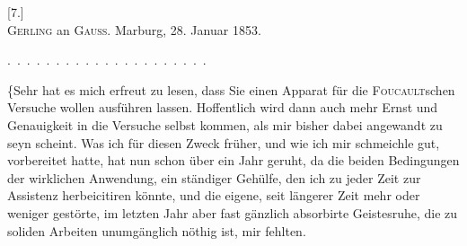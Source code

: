 \clearpage\begingroup{}
\begin{center}
[7.]\\[.7em]
\textsc{Gerling} an \textsc{Gauss}. Marburg, 28. Januar 1853.
\end{center}
\noindent .\ .\ .\ .\ .\ .\ .\ .\ .\ .\ .\ .\ .\ .\ .\ .\ .\ .\ .\ .\ .
\par\noindent\hspace*{\parindent}\{Sehr hat es mich erfreut zu lesen, dass Sie einen Apparat für die \textsc{Foucault}schen
Versuche wollen ausführen lassen. Hoffentlich wird dann auch
mehr Ernst und Genauigkeit in die Versuche selbst kommen, als mir bisher
dabei angewandt zu seyn scheint. Was ich für diesen Zweck früher, und wie
ich mir schmeichle gut, vorbereitet hatte, hat nun schon über ein Jahr geruht,
da die beiden Bedingungen der wirklichen Anwendung, ein ständiger Gehülfe,
den ich zu jeder Zeit zur Assistenz herbeicitiren könnte, und die eigene,
seit längerer Zeit mehr oder weniger gestörte, im letzten Jahr aber fast gänzlich
absorbirte Geistesruhe, die zu soliden Arbeiten unumgänglich nöthig ist,
mir fehlten.

